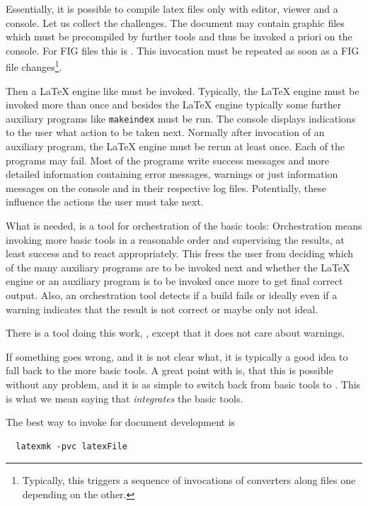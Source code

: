 Essentially, it is possible to compile latex files 
only with editor, viewer and a console. 
Let us collect the challenges. 
The document may contain graphic files 
which must be precompiled by further tools 
and thus be invoked a priori on the console. 
For FIG files this is . 
This invocation must be repeated as soon as a FIG file changes\footnote%
{Typically, this triggers a sequence of invocations of converters 
along files one depending on the other. }. 

Then a \LaTeX{} engine like \lualatex{} must be invoked. 
Typically, the \LaTeX{} engine must be invoked more than once 
and besides the \LaTeX{} engine typically 
some further auxiliary programs like \texttt{makeindex} must be run. 
The console displays indications to the user what action to be taken next. 
Normally after invocation of an auxiliary program, 
the \LaTeX{} engine must be rerun at least once. 
Each of the programs may fail. 
Most of the programs write success messages and more detailed information 
containing error messages, warnings or just information messages 
on the console and in their respective log files. 
Potentially, these influence the actions the user must take next. 
\smallskip

What is needed, is a tool for orchestration 
of the basic tools: 
Orchestration means invoking more basic tools in a reasonable order 
and supervising the results, at least success and to react appropriately. 
This frees the user from deciding 
which of the many auxiliary programs are to be invoked next 
and whether the \LaTeX{} engine or an auxiliary program 
is to be invoked once more 
to get final correct output. 
Also, an orchestration tool detects if a build fails 
or ideally even if a warning indicates 
that the result is not correct or maybe only not ideal. 

There is a tool doing this work, , 
except that it does not care about warnings. 

If something goes wrong, and it is not clear what, 
it is typically a good idea to fall back to the more basic tools. 
A great point with  is, 
that this is possible without any problem, 
and it is as simple to switch back from basic tools to . 
This is what we mean saying that  
\emph{integrates} the basic tools. 

The best way to invoke  for document development is 
%
\begin{Verbatim}
  latexmk -pvc latexFile
\end{Verbatim}

